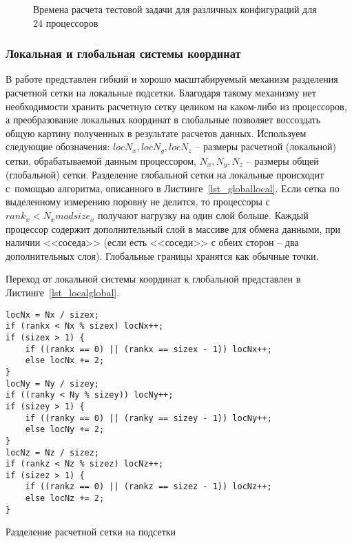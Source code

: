\begin{figure}[!h]
\begin{center}
\caption{Времена расчета тестовой задачи для различных конфигураций для 24 процессоров}
\label{diagr_div}
\end{center}
\end{figure}

\subsubsection{Локальная и глобальная системы координат}
В работе представлен гибкий и хорошо масштабируемый механизм разделения
расчетной сетки на локальные подсетки. Благодаря такому механизму
нет необходимости хранить расчетную сетку целиком на каком-либо из
процессоров, а преобразование локальных координат в глобальные
позволяет воссоздать общую картину полученных в результате расчетов
данных.
Используем следующие обозначения:
$locN_x, locN_y, locN_z$ -- размеры расчетной (локальной) сетки, обрабатываемой
данным процессором, $N_x, N_y, N_z$ -- размеры общей (глобальной) сетки.
Разделение глобальной сетки на локальные происходит с~помощью
алгоритма, описанного в Листинге~\ref{lst_globallocal}. 
Если сетка по выделенному измерению поровну не делится, то процессоры с $rank_x < N_x mod size_x$ получают нагрузку
на один слой больше. Каждый процессор содержит дополнительный слой в массиве для обмена данными, при 
наличии <<соседа>> (если есть <<соседи>> с обеих сторон -- два дополнительных слоя).
Глобальные границы хранятся как обычные точки.

Переход от локальной
системы координат к глобальной представлен в Листинге~\ref{lst_localglobal}.

\begin{listing}[!h]
\begin{verbatim}
locNx = Nx / sizex;
if (rankx < Nx % sizex) locNx++;
if (sizex > 1) {
    if ((rankx == 0) || (rankx == sizex - 1)) locNx++;
    else locNx += 2;
}
locNy = Ny / sizey;
if ((ranky < Ny % sizey)) locNy++;
if (sizey > 1) {
    if ((ranky == 0) || (ranky == sizey - 1)) locNy++;
    else locNy += 2;
}
locNz = Nz / sizez;
if (rankz < Nz % sizez) locNz++;
if (sizez > 1) {
    if ((rankz == 0) || (rankz == sizez - 1)) locNz++;
    else locNz += 2;
}
\end{verbatim}
\caption{Разделение расчетной сетки на подсетки}
\label{lst_globallocal}
\end{listing}

